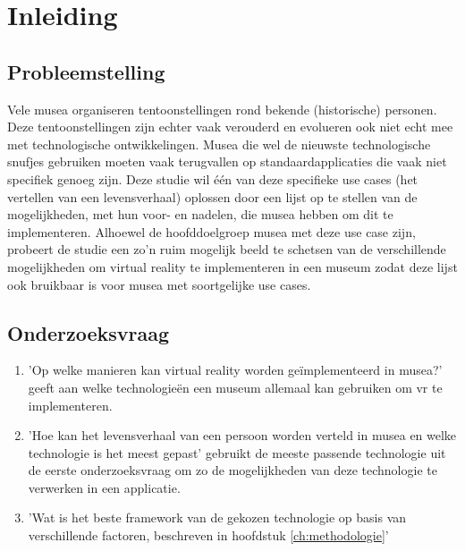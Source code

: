 
\chapter{Inleiding}
\label{ch:inleiding}

\section{Probleemstelling}
\label{sec:probleemstelling}

Vele musea organiseren tentoonstellingen rond bekende (historische) personen. Deze tentoonstellingen zijn echter vaak verouderd en evolueren ook niet echt mee met technologische ontwikkelingen. Musea die wel de nieuwste technologische snufjes gebruiken moeten vaak terugvallen op standaardapplicaties die vaak niet specifiek genoeg zijn. Deze studie wil één van deze specifieke use cases (het vertellen van een levensverhaal) oplossen door een lijst op te stellen van de mogelijkheden, met hun voor- en nadelen, die musea hebben om dit te implementeren. Alhoewel de hoofddoelgroep musea met deze use case zijn, probeert de studie een zo'n ruim mogelijk beeld te schetsen van de verschillende mogelijkheden om virtual reality te implementeren in een museum zodat deze lijst ook bruikbaar is voor musea met soortgelijke use cases.

\section{Onderzoeksvraag}
\label{sec:onderzoeksvraag}

\begin{enumerate}
    \item 'Op welke manieren kan virtual reality worden geïmplementeerd in musea?' geeft aan welke technologieën een museum allemaal kan gebruiken om \acrshort{vr} te implementeren.
    \item 'Hoe kan het levensverhaal van een persoon worden verteld in musea en welke technologie is het meest gepast' gebruikt de meeste passende technologie uit de eerste onderzoeksvraag om zo de mogelijkheden van deze technologie te verwerken in een applicatie.
    \item 'Wat is het beste framework van de gekozen technologie op basis van verschillende factoren, beschreven in hoofdstuk \ref{ch:methodologie}' 
\end{enumerate}

